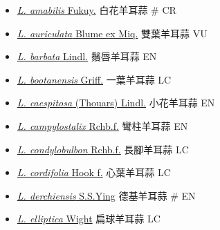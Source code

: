 \begin{itemize}
  \begin{itemize}
        \item[] \href{http://www.theplantlist.org/tpl1.1/search?q=Liparis+amabilis}{\textit{L. amabilis} Fukuy.}   白花羊耳蒜  \# CR
        \item[] \href{http://www.theplantlist.org/tpl1.1/search?q=Liparis+auriculata}{\textit{L. auriculata} Blume ex Miq.}   雙葉羊耳蒜   VU
        \item[] \href{http://www.theplantlist.org/tpl1.1/search?q=Liparis+barbata}{\textit{L. barbata} Lindl.}   鬚唇羊耳蒜   EN
        \item[] \href{http://www.theplantlist.org/tpl1.1/search?q=Liparis+bootanensis}{\textit{L. bootanensis} Griff.}   一葉羊耳蒜   LC
        \item[] \href{http://www.theplantlist.org/tpl1.1/search?q=Liparis+caespitosa}{\textit{L. caespitosa} (Thouars) Lindl.}   小花羊耳蒜   EN
        \item[] \href{http://www.theplantlist.org/tpl1.1/search?q=Liparis+campylostalix}{\textit{L. campylostalix} Rchb.f.}   彎柱羊耳蒜   EN
        \item[] \href{http://www.theplantlist.org/tpl1.1/search?q=Liparis+condylobulbon}{\textit{L. condylobulbon} Rchb.f.}   長腳羊耳蒜   LC
        \item[] \href{http://www.theplantlist.org/tpl1.1/search?q=Liparis+cordifolia}{\textit{L. cordifolia} Hook f.}   心葉羊耳蒜   LC
        \item[] \href{http://www.theplantlist.org/tpl1.1/search?q=Liparis+derchiensis}{\textit{L. derchiensis} S.S.Ying}   德基羊耳蒜  \# EN
        \item[] \href{http://www.theplantlist.org/tpl1.1/search?q=Liparis+elliptica}{\textit{L. elliptica} Wight}   扁球羊耳蒜   LC

\end{itemize}
\end{itemize}
